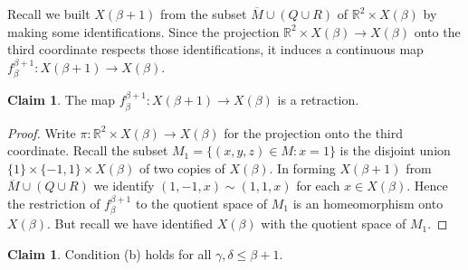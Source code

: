 \documentclass[12pt]{article}
\theoremstyle{plain}
\theoremstyle{definition}
\newcounter{ClaimCounter}
\newtheorem{claim}[ClaimCounter]{Claim}
\newcounter{claim5counter}
\newcommand{\B}{\ensuremath{\beta}}
\newcommand{\G}{\ensuremath{\gamma}}
\newcommand{\D}{\ensuremath{\delta}}
\newcommand{\RR}{\ensuremath{\mathbb R}}
\newcommand{\0}{\ensuremath{\varnothing}}
\begin{document}
	Recall we built $X(\B+1)$ from the subset $\overline M \cup (Q \cup R)$ of $\RR^2 \times X(\B)$ by making some identifications.
	Since the projection $\RR^2 \times X(\B) \to X(\B)$ onto the third coordinate respects those identifications, it induces a continuous map $f^{\B+1}_\B: X(\B+1) \to X(\B)$. 
	
	
	\begin{claim}
		The map $f^{\B+1}_\B : X(\B+1) \to X(\B)$ is a retraction.
	\end{claim}
	
	\begin{proof}
		Write $\pi: \RR^2 \times X(\B) \to X(\B)$ for the projection onto the third coordinate. Recall the subset $M_1 = \big \{ (x,y,z) \in M: x = 1 \big \}$ is the disjoint union \mbox{$\{1\} \times \{-1,1\} \times X(\B)$} of two copies of $X(\B)$. In forming $X(\B+1)$ from  $\overline M \cup (Q \cup R)$ we identify $(1,-1,x) \sim (1,1,x)$ for each $x \in X(\B)$. Hence the restriction of $f^{\B+1}_\B$ to the quotient space of $M_1$ is an homeomorphism onto $X(\B)$. But recall we have identified $X(\B)$ with the quotient space of $M_1$.
	\end{proof}
	
	
	\begin{claim}
		Condition (b) holds for all $\G,\D \le \B+1$.
	\end{claim}
	
	
	
\end{document}
